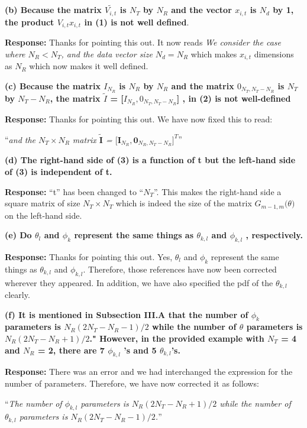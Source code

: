 \documentclass[12pt]{letter}
\begin{document}
\textbf{(b) Because the matrix $\tilde{V_{i,t}}$ is $N_T$ by $N_R$ and
  the vector $x_{i,t}$ is $N_d$ by 1, the product $V_{i,t}x_{i,t}$ in
  (1) is not well defined}.

\textbf{Response:} Thanks for pointing this out.  It now reads
\emph{We consider the case where $N_R < N_T$, and the data vector size
  $N_d = N_R$} which makes $x_{i,t}$ dimensions as $N_R$ which now
makes it well defined.

\textbf{(c) Because the matrix $I_{N_R}$ is $N_R$ by $N_R$ and the
  matrix $0_{N_T , N_T - N_R }$ is $N_T$ by $N_T - N_R$, the matrix
  $\tilde{I}$ = [$I_{N_R}, 0_{N_T, N_T - N_R }$] , in (2) is not
  well-defined}

\textbf{Response:} Thanks for pointing this out.  We have now fixed
this to read:

``\emph{and the $N_T \times N_R$ matrix
  $\tilde{\textbf{I}}$ =
  $\big[\textbf{I}_{N_R }, {\boldsymbol{0}}_{N_R ,N_T
    -N_R}\big]^{T}$}''

\textbf{(d) The right-hand side of (3) is a function of t but the left-hand side of (3) is independent of t.}

\textbf{Response:} ``t'' has been changed to ``$N_T$''. This makes the
right-hand side a square matrix of size $N_T \times N_T$ which is
indeed the size of the matrix $G_{m-1,m}\big(\theta\big)$ on the
left-hand side.

\textbf{(e) Do $\theta_l$ and $\phi_k$ represent the same things as $\theta_{k,l}$ and $\phi_{k,l}$ , respectively.}

\textbf{Response:} Thanks for pointing this out. Yes, $\theta_l$ and
$\phi_k$ represent the same things as $\theta_{k,l}$ and
$\phi_{k,l}$. Therefore, those references have now been corrected
wherever they appeared. In addition, we have also specified the pdf of
the $\theta_{k,l}$ clearly.

\textbf{(f) It is mentioned in Subsection III.A that the number of
  $\phi_k$ parameters is $N_R(2N_T - N_R -1 )/2$ while the number of
  $\theta$ parameters is $N_R(2N_T -N_R + 1)/2$." However, in the
  provided example with $N_T$ = 4 and $N_R$ = 2, there are 7
  $\phi_{k,l}$ 's and 5 $\theta_{k,l}$'s.}

\textbf{Response:} There was an error and we had interchanged the
expression for the number of parameters. Therefore, we have now
corrected it as follows:

``\emph{The number of $\phi_{k,l}$ parameters is
  $N_{R}(2N_{T} - N_{R}+1)/2$ while the number of $\theta_{k,l}$
  parameters is $N_{R}(2N_{T} - N_{R}-1)/2$.}''
\end{document}
